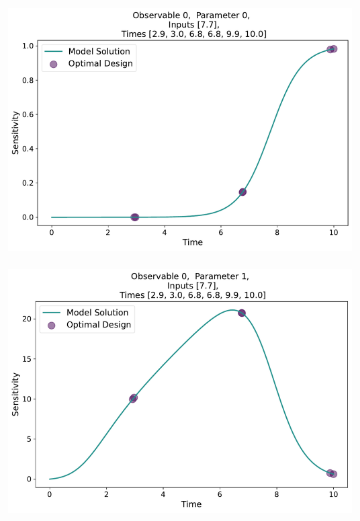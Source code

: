 \documentclass[10pt,A4paper]{article}
\begin{document}
\begin{figure}[H]
    \begin{subfigure}{.9\textwidth}
      \centering
      \includegraphics[scale=0.35]{Figures/Sensitivity_Results_baranyi_roberts_ode_fisher_determinant_rel_sensit_cont_6times_1temps_000_x_00_p_00.pdf}
    \end{subfigure}
    \begin{subfigure}{.9\textwidth}
      \centering
      \includegraphics[scale=0.35]{Figures/Sensitivity_Results_baranyi_roberts_ode_fisher_determinant_rel_sensit_cont_6times_1temps_000_x_00_p_01.pdf}
    \end{subfigure}


\end{figure}
\end{document}
